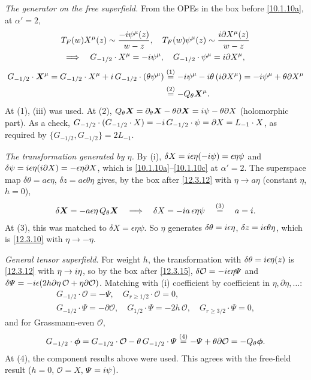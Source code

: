 \begin{tcolorbox}[breakable]
\begin{remark}
		\emph{The generator on the free superfield.} From the OPEs in the box before \eqref{10.1.10a}, at $\alpha'=2$,
		\begin{gather*}
			T_{F}(w)X^{\mu}(z)\sim\frac{-i\psi^{\mu}(z)}{w-z},\quad T_{F}(w)\psi^{\mu}(z)\sim\frac{i\partial X^{\mu}(z)}{w-z}\\
			\Longrightarrow\quad G_{-1/2}\cdot X^{\mu}=-i\psi^{\mu},\quad G_{-1/2}\cdot\psi^{\mu}=i\partial X^{\mu},
		\end{gather*}
		\begin{align*}
			G_{-1/2}\cdot\bm X^{\mu}=G_{-1/2}\cdot X^{\mu}+i\,G_{-1/2}\cdot(\theta\psi^{\mu})
			&\overset{(1)}{=} -i\psi^{\mu}-i\theta\,(i\partial X^{\mu})=-i\psi^{\mu}+\theta\partial X^{\mu}\\
			&\overset{(2)}{=} -Q_{\theta}\bm X^{\mu} .
		\end{align*}
		At (1), (iii) was used. At (2), $Q_{\theta}\bm X=\partial_{\theta}\bm X-\theta\partial\bm X=i\psi-\theta\partial X$ (holomorphic part). As a check, $G_{-1/2}\cdot(G_{-1/2}\cdot X)=-i\,G_{-1/2}\cdot\psi=\partial X=L_{-1}\cdot X$, as required by $\{G_{-1/2},G_{-1/2}\}=2L_{-1}$.

		\emph{The transformation generated by $\eta$.} By (i), $\delta X=i\epsilon\eta(-i\psi)=\epsilon\eta\psi$ and $\delta\psi=i\epsilon\eta(i\partial X)=-\epsilon\eta\partial X$, which is \eqref{10.1.10a}--\eqref{10.1.10c} at $\alpha'=2$. The superspace map $\delta\theta=a\epsilon\eta$, $\delta z=a\epsilon\theta\eta$ gives, by the box after \eqref{12.3.12} with $\eta\to a\eta$ (constant $\eta$, $h=0$),
		\begin{align*}
			\delta\bm X=-a\epsilon\eta\,Q_{\theta}\bm X
			\quad\Longrightarrow\quad \delta X=-i a\,\epsilon\eta\psi
			\quad\overset{(3)}{=}\quad a=i .
		\end{align*}
		At (3), this was matched to $\delta X=\epsilon\eta\psi$. So $\eta$ generates $\delta\theta=i\epsilon\eta$, $\delta z=i\epsilon\theta\eta$, which is \eqref{12.3.10} with $\eta\to-\eta$.

		\emph{General tensor superfield.} For weight $h$, the transformation with $\delta\theta=i\epsilon\eta(z)$ is \eqref{12.3.12} with $\eta\to i\eta$, so by the box after \eqref{12.3.15}, $\delta\mathcal O=-i\epsilon\eta\varPsi$ and $\delta\varPsi=-i\epsilon(2h\partial\eta\,\mathcal O+\eta\partial\mathcal O)$. Matching with (i) coefficient by coefficient in $\eta,\partial\eta,\dots$:
		\begin{align*}
			G_{-1/2}\cdot\mathcal O=-\varPsi,\quad G_{r\ge1/2}\cdot\mathcal O=0,\\
			G_{-1/2}\cdot\varPsi=-\partial\mathcal O,\quad G_{1/2}\cdot\varPsi=-2h\,\mathcal O,\quad G_{r\ge3/2}\cdot\varPsi=0,
		\end{align*}
		and for Grassmann-even $\mathcal O$,
		\begin{align*}
			G_{-1/2}\cdot\bm\phi=G_{-1/2}\cdot\mathcal O-\theta\,G_{-1/2}\cdot\varPsi\overset{(4)}{=} -\varPsi+\theta\partial\mathcal O=-Q_{\theta}\bm\phi .
		\end{align*}
		At (4), the component results above were used. This agrees with the free-field result ($h=0$, $\mathcal O=X$, $\varPsi=i\psi$).


\end{remark}
\end{tcolorbox}
